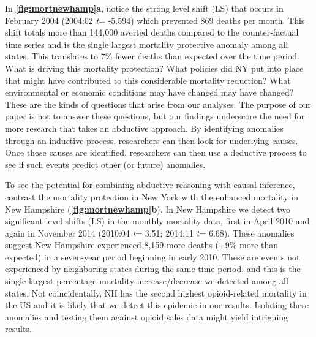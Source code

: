 \documentclass[12pt]{article}
\begin{document}
In \textbf{\autoref{fig:mortnewhamp}a}, notice the strong level shift
(LS) that occurs in February 2004 (2004:02 \emph{t}= -5.594) which
prevented 869 deaths per month. This shift totals more than 144,000
averted deaths compared to the counter-factual time series and is the
single largest mortality protective anomaly among all states. This
translates to 7\% fewer deaths than expected over the time period. What
is driving this mortality protection? What policies did NY put into
place that might have contributed to this considerable mortality
reduction? What environmental or economic conditions may have changed
may have changed? These are the kinds of questions that arise from our
analyses. The purpose of our paper is not to answer these questions, but
our findings underscore the need for more research that takes an
abductive approach. By identifying anomalies through an inductive
process, researchers can then look for underlying causes. Once those
causes are identified, researchers can then use a deductive process to
see if such events predict other (or future) anomalies.

To see the potential for combining abductive reasoning with causal
inference, contrast the mortality protection in New York with the
enhanced mortality in New Hampshire
(\textbf{\autoref{fig:mortnewhamp}b}). In New Hampshire we detect two
significant level shifts (LS) in the monthly mortality data, first in
April 2010 and again in November 2014 (2010:04 \emph{t}= 3.51; 2014:11
\emph{t}= 6.68). These anomalies suggest New Hampshire experienced 8,159
more deaths (+9\% more than expected) in a seven-year period beginning
in early 2010. These are events not experienced by neighboring states
during the same time period, and this is the single largest percentage
mortality increase/decrease we detected among all states. Not
coincidentally, NH has the second highest opioid-related mortality in
the US \citep{beetham2019access} and it is likely that we detect this
epidemic in our results. Isolating these anomalies and testing them
against opioid sales data might yield intriguing results.
\end{document}
